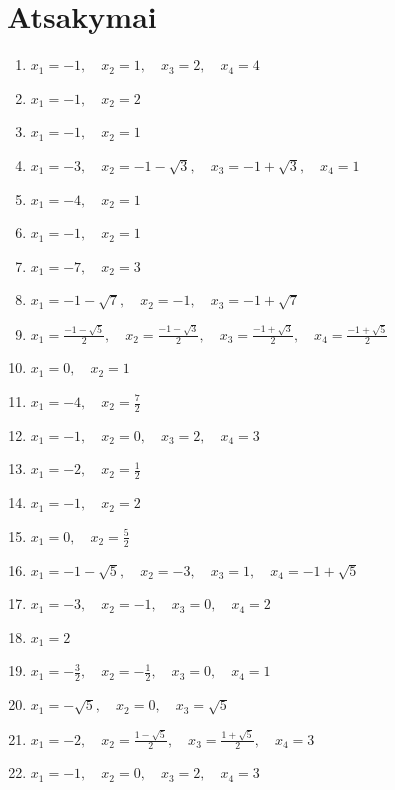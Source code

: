\documentclass[11pt,a4paper]{article}
\begin{document}
\section*{Atsakymai}
\begingroup\small
\begin{enumerate}
\item \(\displaystyle x_{1}=-1,\quad x_{2}=1,\quad x_{3}=2,\quad x_{4}=4\)
\item \(\displaystyle x_{1}=-1,\quad x_{2}=2\)
\item \(\displaystyle x_{1}=-1,\quad x_{2}=1\)
\item \(\displaystyle x_{1}=-3,\quad x_{2}=-1-\sqrt{3},\quad x_{3}=-1+\sqrt{3},\quad x_{4}=1\)
\item \(\displaystyle x_{1}=-4,\quad x_{2}=1\)
\item \(\displaystyle x_{1}=-1,\quad x_{2}=1\)
\item \(\displaystyle x_{1}=-7,\quad x_{2}=3\)
\item \(\displaystyle x_{1}=-1-\sqrt{7},\quad x_{2}=-1,\quad x_{3}=-1+\sqrt{7}\)
\item \(\displaystyle x_{1}=\frac{-1-\sqrt{5}}{2},\quad x_{2}=\frac{-1-\sqrt{3}}{2},\quad x_{3}=\frac{-1+\sqrt{3}}{2},\quad x_{4}=\frac{-1+\sqrt{5}}{2}\)
\item \(\displaystyle x_{1}=0,\quad x_{2}=1\)
\item \(\displaystyle x_{1}=-4,\quad x_{2}=\frac{7}{2}\)
\item \(\displaystyle x_{1}=-1,\quad x_{2}=0,\quad x_{3}=2,\quad x_{4}=3\)
\item \(\displaystyle x_{1}=-2,\quad x_{2}=\frac{1}{2}\)
\item \(\displaystyle x_{1}=-1,\quad x_{2}=2\)
\item \(\displaystyle x_{1}=0,\quad x_{2}=\frac{5}{2}\)
\item \(\displaystyle x_{1}=-1-\sqrt{5},\quad x_{2}=-3,\quad x_{3}=1,\quad x_{4}=-1+\sqrt{5}\)
\item \(\displaystyle x_{1}=-3,\quad x_{2}=-1,\quad x_{3}=0,\quad x_{4}=2\)
\item \(\displaystyle x_{1}=2\)
\item \(\displaystyle x_{1}=-\frac{3}{2},\quad x_{2}=-\frac{1}{2},\quad x_{3}=0,\quad x_{4}=1\)
\item \(\displaystyle x_{1}=-\sqrt{5},\quad x_{2}=0,\quad x_{3}=\sqrt{5}\)
\item \(\displaystyle x_{1}=-2,\quad x_{2}=\frac{1-\sqrt{5}}{2},\quad x_{3}=\frac{1+\sqrt{5}}{2},\quad x_{4}=3\)
\item \(\displaystyle x_{1}=-1,\quad x_{2}=0,\quad x_{3}=2,\quad x_{4}=3\)

\end{enumerate}
\end{document}
